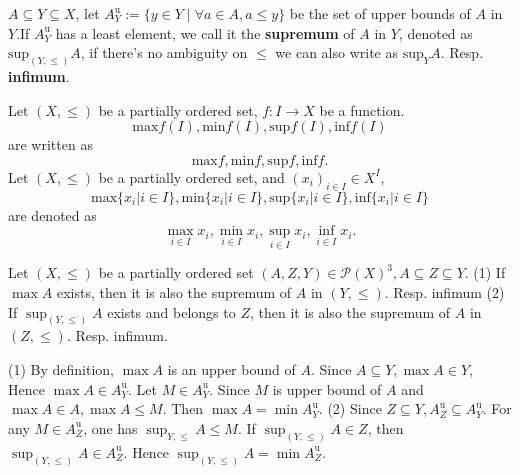 \begin{definitionenv}
    $A\subseteq Y\subseteq X$, let $A_Y^\mathrm{u}:=\{y\in Y\mid \forall a\in A, a\le y\}$ be the set of upper bounds of $A$ in $Y$.If $A_Y^\mathrm{u}$ has a least element, we call it the \textbf{supremum} of $A$ in $Y$,  denoted as $\mathrm{sup}_{(Y, \le)}A$,  if there's no ambiguity on $\le$ we can also write as $\mathrm{sup}_{Y}A$. Resp. \textbf{infimum}.
\end{definitionenv}
\begin{notationenv}\label{notation4.5.1}
    
         Let $(X, \le)$ be a partially ordered set, $f:I\rightarrow X$ be a function.$$\mathrm{max}f(I), \mathrm{min}f(I), \mathrm{sup}f(I), \mathrm{inf}f(I)$$ are written as $$\mathrm{max}f, \mathrm{min}f, \mathrm{sup}f, \mathrm{inf}f.$$
         Let $(X, \le)$ be a partially ordered set, and $(x_i)_{i\in I}\in X^I$, $$\mathrm{max}\{x_i|i\in I\}, \mathrm{min}\{x_i|i\in I\}, \mathrm{sup}\{x_i|i\in I\}, \mathrm{inf}\{x_i|i\in I\}$$ are denoted as $$\max _{i\in I}x_i, \min _{i\in I}x_i, \sup _{i\in I}x_i, \inf _{i\in I}x_i.$$
    
\end{notationenv}
\begin{propositionenv}\label{proposition4.5.1}
    \quad
    \newline
    Let $(X, \le)$ be a partially ordered set $(A, Z, Y)\in \mathscr{P} (X)^3, A\subseteq Z\subseteq Y$.
    \newline
   (1) If $\max A$ exists, then it is also the supremum of $A$ in $(Y, \le)$. Resp. infimum
    \newline
    (2) If $\sup_{(Y, \le)}A$ exists and belongs to $Z$, then it is also the supremum of $A$ in $(Z, \le)$. Resp. infimum.
\end{propositionenv}
\begin{proofenv}
    \quad \newline
   (1) By definition, $\max A $ is an upper bound of $A$. Since $A\subseteq Y,  \max A \in Y$, Hence $\max A\in A_Y^\mathrm{u}$. Let $M\in A_Y^\mathrm{u} $. Since $M$ is upper bound of $A$ and $\max A\in A, \max A\le M$. Then $\max A=\min A_Y^\mathrm{u}$.
\newline
(2) Since $Z\subseteq Y, A_Z^\mathrm{u}\subseteq A_Y^\mathrm{u}$. For any $M\in A_Z^\mathrm{u}$, one has $\sup _{Y, \le}A\le M$. If $\sup_{(Y, \le)}A\in Z$, then $\sup_{(Y, \le)}A\in A_Z^\mathrm{u}$. Hence $\sup _{(Y, \le)}A=\min A_Z^\mathrm{u}$.
\end{proofenv}
